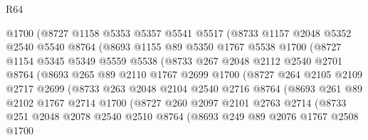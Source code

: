 \begin{lexlean}{R64}
\begin{coremodule}
              @1700
              (@8727
                @1158
                @5353
                @5357
                @5541
                @5517
                (@8733
                  @1157
                  @2048
                  @5352
                  @2540
                  @5540
                  @8764
                  (@8693
                    @1155
                    @89
                    @5350
                    @1767
                    @5538
                    @1700
                    (@8727
                      @1154
                      @5345
                      @5349
                      @5559
                      @5538
                      (@8733
                        @267
                        @2048
                        @2112
                        @2540
                        @2701
                        @8764
                        (@8693
                          @265
                          @89
                          @2110
                          @1767
                          @2699
                          @1700
                          (@8727
                            @264
                            @2105
                            @2109
                            @2717
                            @2699
                            (@8733
                              @263
                              @2048
                              @2104
                              @2540
                              @2716
                              @8764
                              (@8693
                                @261
                                @89
                                @2102
                                @1767
                                @2714
                                @1700
                                (@8727
                                  @260
                                  @2097
                                  @2101
                                  @2763
                                  @2714
                                  (@8733
                                    @251
                                    @2048
                                    @2078
                                    @2540
                                    @2510
                                    @8764
                                    (@8693
                                      @249
                                      @89
                                      @2076
                                      @1767
                                      @2508
                                      @1700

\end{coremodule}
\end{lexlean}
